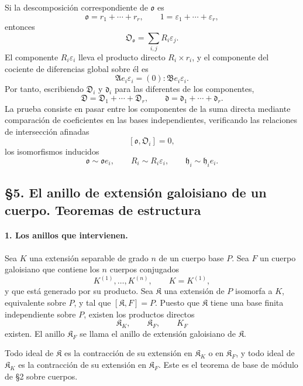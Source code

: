 Si la descomposición correspondiente de $\mathfrak o$ es
\[
        \mathfrak o=r_1+
        \cdots+r_r,
        \qquad
        1=\varepsilon_1+
        \cdots+\varepsilon_r,
\]
entonces
\[
        \mathfrak O_{\mathfrak o}=\sum_{i,j}R_i\varepsilon_j.
\]
El componente $R_i\varepsilon_i$ lleva el producto directo $R_i\times r_i$, y el componente del cociente de diferencias global sobre él es
\[
        \mathfrak A e_i\varepsilon_i=(0):\mathfrak B e_i\varepsilon_i.
\]
Por tanto, escribiendo $\mathfrak D_i$ y $\mathfrak d_i$ para las diferentes de los componentes,
\[
        \mathfrak D=\mathfrak D_1+
        \cdots+\mathfrak D_r,
        \qquad
        \mathfrak d=\mathfrak d_1+
        \cdots+\mathfrak d_r.
\]
La prueba consiste en pasar entre los componentes de la suma directa mediante comparación de coeficientes en las bases independientes, verificando las relaciones de intersección afinadas
\[
        [\mathfrak o,\mathfrak O_i]=0,
\]
los isomorfismos inducidos
\[
        \mathfrak o\sim\mathfrak o e_i,
        \qquad
        R_i\sim R_i\varepsilon_i,
        \qquad
        \mathfrak h_i\sim \mathfrak h_i e_i.
\]

\subsection*{§5. El anillo de extensión galoisiano de un cuerpo. Teoremas de estructura}

\paragraph{1. Los anillos que intervienen.}
Sea $K$ una extensión separable de grado $n$ de un cuerpo base $P$. Sea $F$ un cuerpo galoisiano que contiene los $n$ cuerpos conjugados
\[
        K^{(1)},\ldots,K^{(n)},
        \qquad K=K^{(1)},
\]
y que está generado por su producto. Sea $\mathfrak K$ una extensión de $P$ isomorfa a $K$, equivalente sobre $P$, y tal que $[\mathfrak K,F]=P$. Puesto que $\mathfrak K$ tiene una base finita independiente sobre $P$, existen los productos directos
\[
        \mathfrak K_K,
        \qquad \mathfrak K_F,
        \qquad K_F
\]
existen. El anillo $\mathfrak K_F$ se llama el anillo de extensión galoisiano de $\mathfrak K$.

Todo ideal de $\mathfrak K$ es la contracción de su extensión en $\mathfrak K_K$ o en $\mathfrak K_F$, y todo ideal de $\mathfrak K_K$ es la contracción de su extensión en $\mathfrak K_F$. Este es el teorema de base de módulo de §2 sobre cuerpos.

